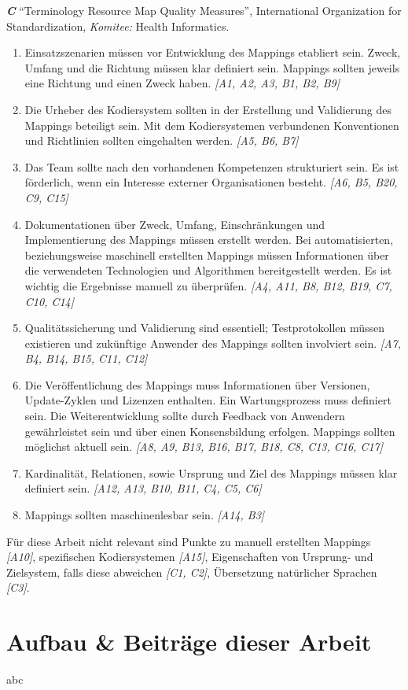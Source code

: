 \textbf{\emph{C}} "`Terminology Resource Map Quality Measures"', International Organization for Standardization, \emph{Komitee:} Health Informatics. \cite{ISO21564} \\

\begin{enumerate}
\item Einsatzszenarien müssen vor Entwicklung des Mappings etabliert sein. Zweck, Umfang und die Richtung müssen klar definiert sein. Mappings sollten jeweils eine Richtung und einen Zweck haben. \emph{[A1, A2, A3, B1, B2, B9]}
\item Die Urheber des Kodiersystem sollten in der Erstellung und Validierung des Mappings beteiligt sein. Mit dem Kodiersystemen verbundenen Konventionen und Richtlinien sollten eingehalten werden. \emph{[A5, B6, B7]}
\item Das Team sollte nach den vorhandenen Kompetenzen strukturiert sein. Es ist förderlich, wenn ein Interesse externer Organisationen besteht. \emph{[A6, B5, B20, C9, C15]}
\item Dokumentationen über Zweck, Umfang, Einschränkungen und Implementierung des Mappings müssen erstellt werden. Bei automatisierten, beziehungsweise maschinell erstellten Mappings müssen Informationen über die verwendeten Technologien und Algorithmen bereitgestellt werden. Es ist wichtig die Ergebnisse manuell zu überprüfen. \emph{[A4, A11, B8, B12, B19, C7, C10, C14]}
\item Qualitätssicherung und Validierung sind essentiell; Testprotokollen müssen existieren und zukünftige Anwender des Mappings sollten involviert sein. \emph{[A7, B4, B14, B15, C11, C12]}
\item Die Veröffentlichung des Mappings muss Informationen über Versionen, Update-Zyklen und Lizenzen enthalten. Ein Wartungsprozess muss definiert sein. Die Weiterentwicklung sollte durch Feedback von Anwendern gewährleistet sein und über einen Konsensbildung erfolgen. Mappings sollten möglichst aktuell sein. \emph{[A8, A9, B13, B16, B17, B18, C8, C13, C16, C17]}
\item Kardinalität, Relationen, sowie Ursprung und Ziel des Mappings müssen klar definiert sein. \emph{[A12, A13, B10, B11, C4, C5, C6]}
\item Mappings sollten maschinenlesbar sein. \emph{[A14, B3]}
\end{enumerate}

Für diese Arbeit nicht relevant sind Punkte zu manuell erstellten Mappings \emph{[A10]}, spezifischen Kodiersystemen \emph{[A15]}, Eigenschaften von Ursprung- und Zielsystem, falls diese abweichen \emph{[C1, C2]}, Übersetzung natürlicher Sprachen \emph{[C3]}. 

\section{Aufbau \& Beiträge dieser Arbeit}

abc
